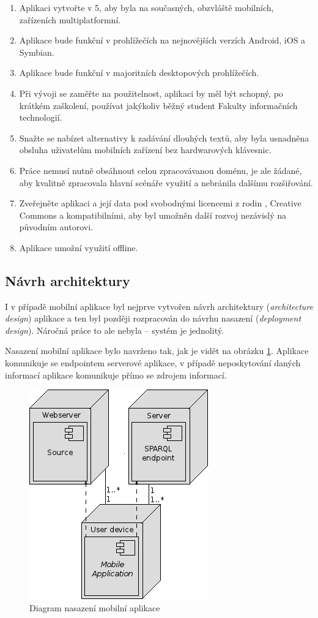 \begin{enumerate}
 \item Aplikaci vytvořte v 5, aby byla na současných, obzvláště mobilních, zařízeních multiplatformní.
 \item Aplikace bude funkční v prohlížečích na nejnovějších verzích  Android, iOS a Symbian.
 \item Aplikace bude funkční v majoritních desktopových prohlížečích.
 \item Při vývoji se zaměřte na použitelnost, aplikaci by měl být schopný, po krátkém zaškolení, používat jakýkoliv běžný student Fakulty informačních technologií.
 \item Snažte se nabízet alternativy k zadávání dlouhých textů, aby byla usnadněna obsluha uživatelům mobilních zařízení bez hardwarových klávesnic.
 \item Práce nemusí nutně obsáhnout celou zpracovávanou doménu, je ale žádané, aby kvalitně zpracovala hlavní scénáře využití a nebránila dalšímu rozšiřování.
 \item Zveřejněte aplikaci a její data pod svobodnými licencemi z rodin , Creative Commons a kompatibilními, aby byl umožněn další rozvoj nezávislý na původním autorovi.
 \item Aplikace umožní využití offline.
\end{enumerate}


\subsection{Návrh architektury}
I v případě mobilní aplikace byl nejprve vytvořen návrh architektury (\textit{architecture design}) aplikace a ten byl později rozpracován do návrhu nasazení (\textit{deployment design}). Náročná práce to ale nebyla -- systém je jednolitý.

Nasazení mobilní aplikace bylo navrženo tak, jak je vidět na obrázku \ref{fig:mobile:deployment}. Aplikace komunikuje se  endpointem serverové aplikace, v případě neposkytování daných informací aplikace komunikuje přímo se zdrojem informací.
\begin{figure}[h]
 \centering
 \includegraphics{./figures/deployment-m.png}
 \caption{Diagram nasazení mobilní aplikace}
 \label{fig:mobile:deployment}
\end{figure}


